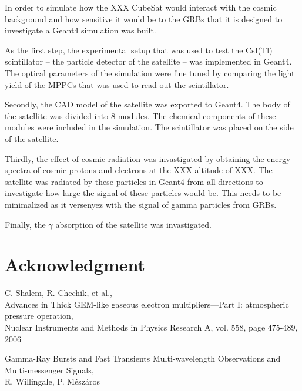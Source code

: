 \documentclass[12pt, a4paper,titlepage]{article}
\numberwithin{equation}{section}
\numberwithin{figure}{section}
\begin{document}
In order to simulate how the XXX CubeSat would interact with the cosmic background and how sensitive it would be to the GRBs that it is designed to investigate a Geant4 simulation was built.

As the first step, the experimental setup that was used to test the CsI(Tl) scintillator -- the particle detector of the satellite -- was implemented in Geant4. The optical parameters of the simulation were fine tuned by comparing the light yield of the MPPCs that was used to read out the scintillator.

Secondly, the CAD model of the satellite was exported to Geant4. The body of the satellite was divided into 8 modules. The chemical components of these modules were included in the simulation. The scintillator was placed on the side of the satellite.

Thirdly, the effect of cosmic radiation was invastigated by obtaining the energy spectra of cosmic protons and electrons at the XXX altitude of XXX. The satellite was radiated by these particles in Geant4 from all directions to investigate how large the signal of these particles would be. This needs to be minimalized as it versenyez with the signal of gamma particles from GRBs.

Finally, the $\gamma$ absorption of the satellite was invastigated.

\pagebreak

\section{Acknowledgment}

 
\pagebreak

\begin{thebibliography}{99}

 C. Shalem, R. Chechik, et al.,\\
Advances in Thick GEM-like gaseous electron multipliers—Part I: atmospheric pressure operation,\\
Nuclear Instruments and Methods in Physics Research A, vol. 558, page 475-489, 2006

 Gamma-Ray Bursts and Fast Transients
Multi-wavelength Observations and Multi-messenger Signals,\\
R. Willingale, P. Mészáros


\end{thebibliography}

\pagebreak
\end{document}
